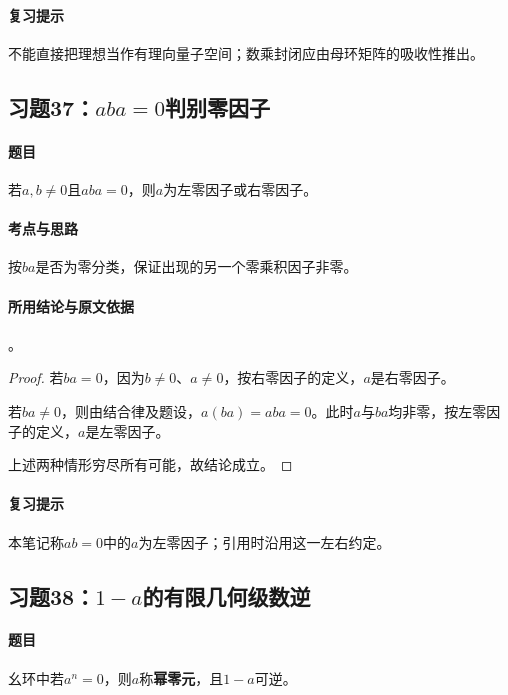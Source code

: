 \paragraph{复习提示}
不能直接把理想当作有理向量子空间；数乘封闭应由母环矩阵的吸收性推出。


\subsection{习题37：\texorpdfstring{$aba=0$判别零因子}{aba=0判别零因子}}
\label{ex:1:37}

\paragraph{题目}
若$a,b\neq0$且$aba=0$，则$a$为左零因子或右零因子。

\paragraph{考点与思路}
按$ba$是否为零分类，保证出现的另一个零乘积因子非零。

\paragraph{所用结论与原文依据}
。


\begin{proof}
若$ba=0$，因为$b\ne0$、$a\ne0$，按右零因子的定义，$a$是右零因子。

若$ba\ne0$，则由结合律及题设，$a(ba)=aba=0$。此时$a$与$ba$均非零，按左零因子的定义，$a$是左零因子。

上述两种情形穷尽所有可能，故结论成立。
\end{proof}

\paragraph{复习提示}
本笔记称$ab=0$中的$a$为左零因子；引用时沿用这一左右约定。


\subsection{习题38：\texorpdfstring{$1-a$的有限几何级数逆}{1-a的有限几何级数逆}}
\label{ex:1:38}

\paragraph{题目}
幺环中若$a^n=0$，则$a$称\textbf{幂零元}，且$1-a$可逆。

